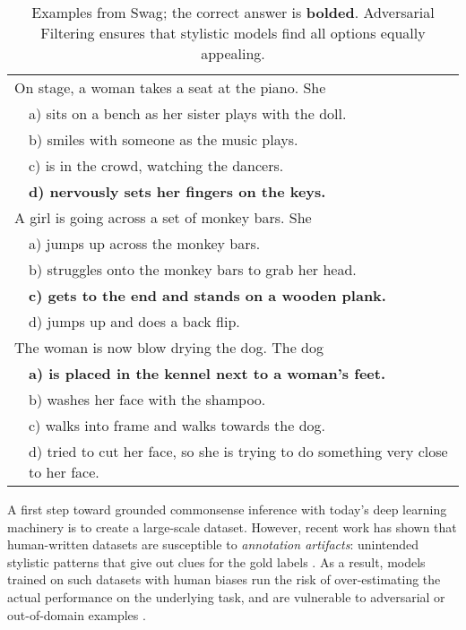 \documentclass[11pt,a4paper]{article}
\newcommand\customfont[1]{{\usefont{T1}{perm}{m}{n}#1}}
\newcommand{\datasetname}{{\small\customfont{Swag}}}
\begin{document}
\begin{table}[t!]
  \centering\small
\begin{tabular}{@{} p{0.2cm}p{7.0cm} @{}}
  \toprule
\multicolumn{2}{l}{\parbox{7.0cm}{On stage, a woman takes a seat at the piano. She}} \\ \rule{0pt}{2ex}
  & a) sits on a bench as her sister plays with the doll. \\
  & b) smiles with someone as the music plays. \\  
  & c) is in the crowd, watching the dancers. \\ 
  & \textbf{d) nervously sets her fingers on the keys.} \\\midrule
\multicolumn{2}{l}{\parbox{7.0cm}{A girl is going across a set of monkey bars. She}} \\ \rule{0pt}{2ex}
  & a) jumps up across the monkey bars. \\
  & b) struggles onto the monkey bars to grab her head. \\
  & \textbf{c) gets to the end and stands on a wooden plank.} \\
  & d) jumps up and does a back flip. \\ \midrule
\multicolumn{2}{l}{\parbox{7.0cm}{The woman is now blow drying the dog. The dog}} \\ \rule{0pt}{2ex}
  & \textbf{a) is placed in the kennel next to a woman's feet.} \\
  & b) washes her face with the shampoo. \\
  & c) walks into frame and walks towards the dog. \\& d) tried to cut her face, so she is trying to do something very close to her face. 
  \\


\bottomrule
  \end{tabular}
\caption{Examples from \datasetname; the correct answer is {\bf bolded}. Adversarial Filtering ensures that stylistic models find all options equally appealing.}
  \label{tab:examples}
\end{table}

A first step toward grounded commonsense inference with today's deep learning machinery is to create a large-scale dataset. 
However, recent work has shown that human-written datasets are susceptible to \emph{annotation artifacts}: unintended stylistic patterns that give out clues for the gold labels \cite{gururangan2018annotation,poliak_hypothesis_2018}. 
As a result, models trained on such datasets with human biases run the risk of 
over-estimating the actual performance on the underlying task, 
and are vulnerable to adversarial or out-of-domain examples \cite{wang2018glue, glockner2018breaking}.
\end{document}
